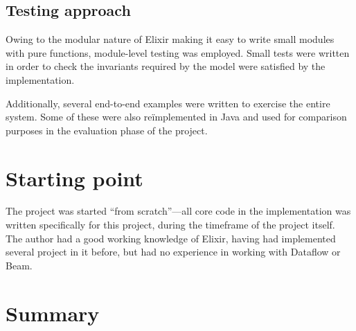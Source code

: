 \subsection{Testing approach}

Owing to the modular nature of Elixir making it easy to write small modules with pure functions, module-level testing was employed.
Small tests were written in order to check the invariants required by the model were satisfied by the implementation.


Additionally, several end-to-end examples were written to exercise the entire system.
Some of these were also re\"implemented in Java and used for comparison purposes in the evaluation phase of the project.

\section{Starting point}\label{sec:prep:starting}

The project was started ``from scratch''---all core code in the implementation was written specifically for this project, during the timeframe of the project itself.
The author had a good working knowledge of Elixir, having had implemented several project in it before, but had no experience in working with Dataflow or Beam.

\section{Summary}\label{sec:prep:summary}

